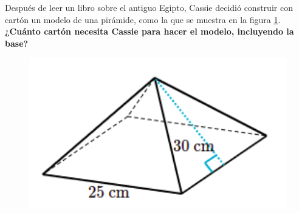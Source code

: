\question[10] Después de leer un libro sobre el antiguo Egipto, Cassie decidió construir con cartón un modelo de una pirámide,
como la que se muestra en la figura \ref{fig:prob_verb_superficie_05}.
\textbf{¿Cuánto cartón necesita Cassie para hacer el modelo, incluyendo la base?}

\begin{minipage}{0.3\linewidth}
    \begin{figure}[H]
        \begin{center}
            \includegraphics[width=1\textwidth]{../images/prob_verb_superficie_05}
        \end{center}
        \caption{}
        \label{fig:prob_verb_superficie_05}
    \end{figure}
\end{minipage}
\begin{minipage}{0.7\linewidth}
    \begin{solutionbox}{6cm}
    \end{solutionbox}
\end{minipage}